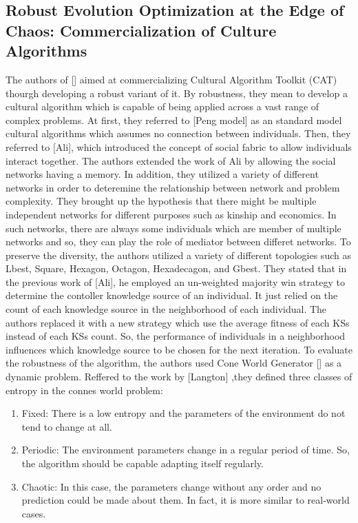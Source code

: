 \subsection{Robust Evolution Optimization at the Edge of Chaos: Commercialization of Culture Algorithms}
The authors of [] aimed at commercializing Cultural Algorithm Toolkit (CAT) thourgh developing a robust variant of it. By robustness, they mean to develop a cultural algorithm which is capable of being applied across a vast range of complex problems. At first, they referred to [Peng model] as an standard model cultural algorithms which assumes no connection between individuals. Then, they referred to [Ali], which introduced the concept of social fabric to allow individuals interact together. The authors extended the work of Ali by allowing the social networks having a memory. In addition, they utilized a variety of different networks in order to deteremine the relationship between network and problem complexity. \newline They brought up the hypothesis that there might be multiple independent networks for different purposes such as kinship and economics. In such networks, there are always some individuals which are member of multiple networks and so, they can play the role of mediator between differet networks. To preserve the diversity, the authors utilized a variety of different topologies such as Lbest, Square, Hexagon, Octagon, Hexadecagon, and Gbest. \newline
They stated that in the previous work of [Ali], he employed an un-weighted majority win strategy to determine the contoller knowledge source of an individual. It just relied on the count of each knowledge source in the neighborhood of each individual. The authors replaced it with a new strategy which use the average fitness of each KSs instead of each KSs count. So, the performance of individuals in a neighborhood influences which knowledge source to be chosen for the next iteration. \newline
To evaluate the robustness of the algorithm, the authors used Cone World Generator [] as a dynamic problem. Reffered to the work by [Langton] ,they defined three classes of entropy in the connes world problem:
\begin{enumerate}
	\item Fixed: There is a low entropy and the parameters of the environment do not tend to change at all.
	\item Periodic: The environment parameters change in a regular period of time. So, the algorithm should be capable adapting itself regularly.
	\item Chaotic: In this case, the parameters change without any order and no prediction could be made about them. In fact, it is more similar to real-world cases.
\end{enumerate}
